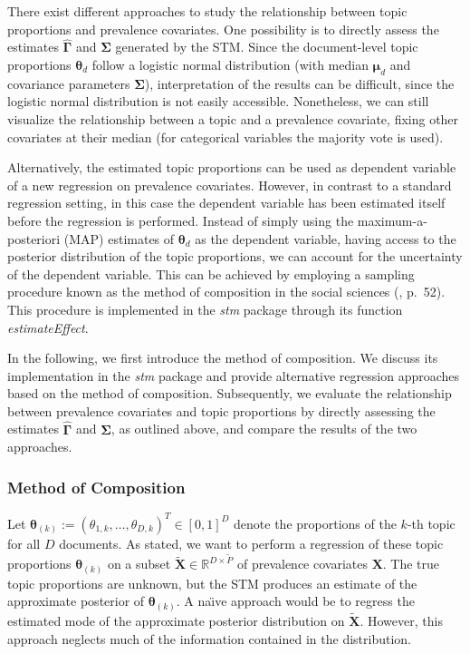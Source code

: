There exist different approaches to study the relationship between topic proportions and prevalence covariates. One possibility is to directly assess the estimates $\hat{\boldsymbol{\Gamma}}$ and $\hat{\boldsymbol{\Sigma}}$ generated by the STM. Since the document-level topic proportions $\boldsymbol{\theta}_d$ follow a logistic normal distribution (with median $\boldsymbol{\mu}_d$ and covariance parameters $\boldsymbol{\Sigma}$), interpretation of the results can be difficult, since the logistic normal distribution is not easily accessible. Nonetheless, we can still visualize the relationship between a topic and a prevalence covariate, fixing other covariates at their median (for categorical variables the majority vote is used).

Alternatively, the estimated topic proportions can be used as dependent variable of a new regression on prevalence covariates. However, in contrast to a standard regression setting, in this case the dependent variable has been estimated itself before the regression is performed. Instead of simply using the maximum-a-posteriori (MAP) estimates of $\boldsymbol{\theta}_d$ as the dependent variable, having access to the posterior distribution of the topic proportions, we can account for the uncertainty of the dependent variable. This can be achieved by employing a sampling procedure known as the method of composition in the social sciences  (\citealp{tanner2012tools}, p.\ 52). This procedure is implemented in the \textit{stm} package through its function \textit{estimateEffect}.

In the following, we first introduce the method of composition. We discuss its implementation in the \textit{stm} package and provide alternative regression approaches based on the method of composition. Subsequently, we evaluate the relationship between prevalence covariates and topic proportions by directly assessing the estimates $\hat{\boldsymbol{\Gamma}}$ and $\hat{\boldsymbol{\Sigma}}$, as outlined above, and compare the results of the two approaches.

\subsubsection{Method of Composition}
\label{Method of Composition}

Let $\boldsymbol{\theta}_{(k)}:=(\theta_{1,k}, \dots, \theta_{D,k})^T \in [0,1]^{D}$ denote the proportions of the $k$-th topic for all $D$ documents. As stated, we want to perform a regression of these topic proportions $\boldsymbol{\theta}_{(k)}$ on a subset $\tilde{\boldsymbol{X}} \in \mathbb{R}^{D \times \tilde{P}}$ of prevalence covariates $\boldsymbol{X}$. The true topic proportions are unknown, but the STM produces an estimate of the approximate posterior of $\boldsymbol{\theta}_{(k)}$. A na{\"\i}ve approach would be to regress the estimated mode of the approximate posterior distribution on $\tilde{\boldsymbol{X}}$. However, this approach neglects much of the information contained in the distribution. 

